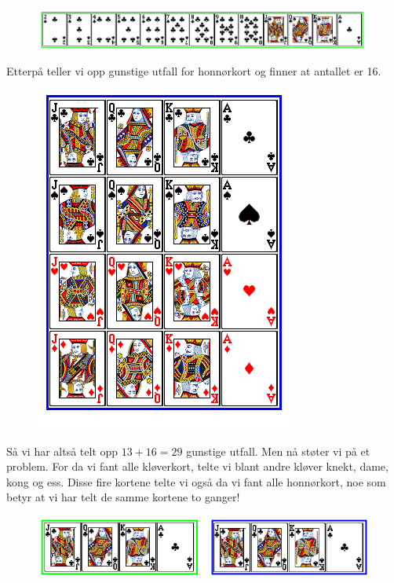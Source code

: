 \qquad
{}
	
	\begin{figure}[H]
		\centering
		\includegraphics[scale=0.45]{kort1}
	\end{figure}
	Etterpå teller vi opp gunstige utfall for honnørkort og finner at 
	antallet er 16. \\
	\begin{figure}[H]
		\centering
		\includegraphics[scale=0.45]{kort2}
	\end{figure}
Så vi har altså telt opp ${13+16=29}$ gunstige utfall. Men nå støter vi på et problem. For da vi fant alle kløverkort, telte vi blant andre kløver knekt, dame, kong og ess. Disse fire kortene telte vi også da vi fant alle honnørkort, noe som betyr at vi har telt de samme kortene to ganger! \\
	\begin{figure}[H]
		\centering
		\includegraphics[scale=0.45]{kort4}
	\end{figure}
